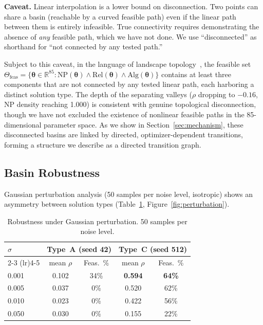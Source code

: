\documentclass[twoside]{article}
\newcommand{\R}{\mathbb{R}}
\newcommand{\btheta}{\boldsymbol{\theta}}
\begin{document}
\textbf{Caveat.} Linear interpolation is a lower bound on disconnection.
Two points can share a basin (reachable by a curved feasible path) even if
the linear path between them is entirely infeasible. True connectivity requires
demonstrating the absence of \emph{any} feasible path, which we have not done.
We use ``disconnected'' as shorthand for ``not connected by any tested path.''

Subject to this caveat, in the language of landscape
topology~\citep{reidys2002combinatorial}, the feasible set $\Theta_{\text{feas}} = \{\btheta \in \R^{85} :
\text{NP}(\btheta) \wedge \text{Rel}(\btheta) \wedge
\text{Alg}(\btheta)\}$ contains at least three components that are
not connected by any tested linear path, each harboring a distinct
solution type. The depth of the separating valleys ($\rho$ dropping
to $-0.16$, NP density reaching 1.000) is consistent with genuine topological disconnection, though we
have not excluded the existence of nonlinear feasible paths in the
85-dimensional parameter space. As we show in
Section~\ref{sec:mechanism}, these disconnected basins are linked by
directed, optimizer-dependent transitions, forming a structure we
describe as a directed transition graph.

\subsection{Basin Robustness}
\label{sec:fragility}

Gaussian perturbation analysis (50 samples per noise level, isotropic) shows
an asymmetry between solution types (Table~\ref{tab:perturbation},
Figure~\ref{fig:perturbation}).

\begin{table}[t]
\caption{Robustness under Gaussian perturbation. 50 samples per noise level.}
\label{tab:perturbation}
\centering
\begin{tabular}{lcccc}
\toprule
$\sigma$ & \multicolumn{2}{c}{Type~A (seed 42)} & \multicolumn{2}{c}{Type~C (seed 512)} \\
\cmidrule(lr){2-3} \cmidrule(lr){4-5}
 & mean $\rho$ & Feas.\ \% & mean $\rho$ & Feas.\ \% \\
\midrule
0.001 & 0.102 & 34\% & \textbf{0.594} & \textbf{64\%} \\
0.005 & 0.037 & 0\% & 0.520 & 62\% \\
0.010 & 0.023 & 0\% & 0.422 & 56\% \\
0.050 & 0.030 & 0\% & 0.155 & 22\% \\
\bottomrule
\end{tabular}
\end{table}
\end{document}
